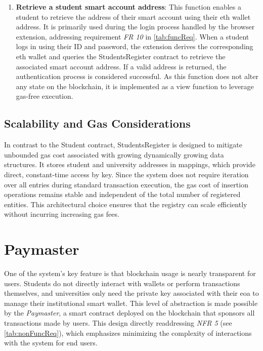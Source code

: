 \begin{enumerate}
    \item \textbf{Retrieve a student smart account address}: This function enables a student to retrieve the address of their smart account using their \acrlong{eth} wallet address. It is primarily used during the login process handled by the browser extension, addressing requirement \textit{FR 10} in \cref{tab:funcReq}. When a student logs in using their ID and password, the extension derives the corresponding \acrlong{eth} wallet and queries the StudentsRegister contract to retrieve the associated smart account address. If a valid address is returned, the authentication process is considered successful. As this function does not alter any state on the blockchain, it is implemented as a view function to leverage gas-free execution.
\end{enumerate}

\subsection{Scalability and Gas Considerations}
In contrast to the Student contract, StudentsRegister is designed to mitigate unbounded gas cost associated with growing dynamically growing data structures. It stores student and university addresses in mappings, which provide direct, constant-time access by key. Since the system does not require iteration over all entries during standard transaction execution, the gas cost of insertion operations remains stable and independent of the total number of registered entities. This architectural choice ensures that the registry can scale efficiently without incurring increasing gas fees.

\section{Paymaster}
\label{sec:paymasterDesign}
One of the system's key feature is that blockchain usage is nearly transparent for users. Students do not directly interact with wallets or perform transactions themselves, and universities only need the private key associated with their \acrshort{eoa} to manage their institutional smart wallet. This level of abstraction is made possible by the \textit{Paymaster}, a smart contract deployed on the blockchain that sponsors all transactions made by users. This design directly readdressing \textit{NFR 5} (see \cref{tab:nonFuncReq}), which emphasizes minimizing the complexity of interactions with the system for end users.

